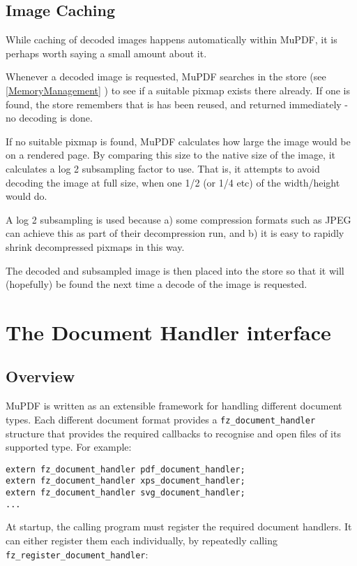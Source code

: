 \documentclass[oneside]{book}
\newcommand{\rjwref}[1] {\autoref{#1} \nameref{#1}}
\begin{document}
\section{Image Caching}

While caching of decoded images happens automatically within MuPDF, it is perhaps worth saying a small amount about it.

Whenever a decoded image is requested, MuPDF searches in the store (see \rjwref{MemoryManagement}) to see if a suitable pixmap exists there already. If one is found, the store remembers that is has been reused, and returned immediately - no decoding is done.

If no suitable pixmap is found, MuPDF calculates how large the image would be on a rendered page. By comparing this size to the native size of the image, it calculates a log 2 subsampling factor to use. That is, it attempts to avoid decoding the image at full size, when one 1/2 (or 1/4 etc) of the width/height would do.

A log 2 subsampling is used because a) some compression formats such as JPEG can achieve this as part of their decompression run, and b) it is easy to rapidly shrink decompressed pixmaps in this way.

The decoded and subsampled image is then placed into the store so that it will (hopefully) be found the next time a decode of the image is requested.

\chapter{The Document Handler interface}
\label{DocumentHandler}

\section{Overview}

MuPDF is written as an extensible framework for handling different document types. Each different document format provides a \texttt{fz\_document\_handler} structure that provides the required callbacks to recognise and open files of its supported type. For example:

\begin{lstlisting}
extern fz_document_handler pdf_document_handler;
extern fz_document_handler xps_document_handler;
extern fz_document_handler svg_document_handler;
...
\end{lstlisting}

At startup, the calling program must register the required document handlers. It can either register them each individually, by repeatedly calling \texttt{fz\_register\_document\_handler}:
\end{document}
